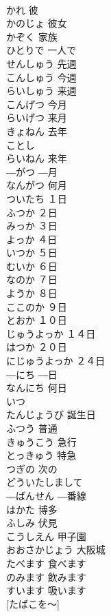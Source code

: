 \documentclass[8pt]{extreport}
\begin{document}
\begin{CJK}{UTF8}{min}
\\	かれ	彼	
\\	かのじょ	彼女	
\\	かぞく	家族	
\\	ひとりで	一人で	
\\	せんしゅう	先週	
\\	こんしゅう	今週	
\\	らいしゅう	来週	
\\	こんげつ	今月	
\\	らいげつ	来月	
\\	きょねん	去年	
\\	ことし			
\\	らいねん	来年	
\\	―がつ	―月	
\\	なんがつ	何月	
\\	ついたち	１日	
\\	ふつか	２日	
\\	みっか	３日	
\\	よっか	４日	
\\	いつか	５日	
\\	むいか	６日	
\\	なのか	７日	
\\	ようか	８日	
\\	ここのか	９日	
\\	とおか	１０日	
\\	じゅうよっか	１４日	
\\	はつか	２０日	
\\	にじゅうよっか	２４日	
\\	―にち	―日	
\\	なんにち	何日	
\\	いつ			
\\	たんじょうび	誕生日	
\\	ふつう	普通	
\\	きゅうこう	急行	
\\	とっきゅう	特急	
\\	つぎの	次の	
\\	どういたしまして			
\\	―ばんせん	―番線	
\\	はかた	博多	
\\	ふしみ	伏見	
\\	こうしえん	甲子園	
\\	おおさかじょう	大阪城	
\\	たべます	食べます	
\\	のみます	飲みます	
\\	すいます	吸います	
\\	[たばこを～]	[たばこを～]		

\end{CJK}
\end{document}
